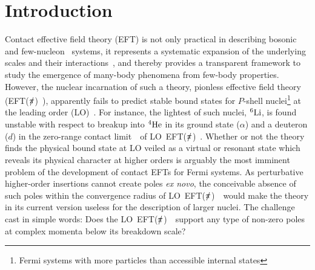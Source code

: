 \documentclass[5p,times]{elsarticle}
\newcommand{\eftnopi}{\mbox{EFT($\slashed{\pi}$) }}
\begin{document}
\maketitle

\section{Introduction}

Contact effective field theory (EFT) is not only practical in describing
bosonic~\cite{Bazak:2016wxm,Carlson:2017txq,Bazak:2018qnu,Bedaque:1998kg,Bedaque:1998km} 
and few-nucleon~\cite{Bedaque:1999ve,Barnea:2013uqa} systems, it represents a systematic
expansion of the underlying scales and their interactions~\cite{Hammer:2019poc,Barnea:2013uqa}, and
thereby provides a transparent framework to study the emergence of many-body phenomena
from few-body properties.
However, the nuclear incarnation of such a theory, pionless effective field
theory (\eftnopi), apparently fails to predict
stable bound states for $P$-shell
nuclei\footnote{Fermi systems with more particles than accessible internal states}
at the leading order (LO)~\cite{Stetcu:2006ey,Contessi:2017rww,Dawkins:2019vcr,Schafer:2020ivj}. 
%
For instance, the lightest of such nuclei, $^6 {\rm Li}$, is 
found unstable with respect to breakup into $\rm ^4He$ in its ground state ($\alpha$)
and a deuteron ($d$) in the zero-range contact limit~\cite{Schafer:2020ivj}~of LO~\eftnopi.
Whether or not the theory finds the physical bound state at LO veiled as a virtual or resonant state which
reveals its physical character at higher orders is arguably the most imminent problem of the
development of contact EFTs for Fermi systems.
As perturbative higher-order insertions cannot create poles {\it ex novo},
the conceivable absence of such poles
within the convergence radius of LO~\eftnopi~would make the theory in its current version
useless for the description of larger nuclei.
The challenge cast in simple words: 
Does the LO~\eftnopi~support any type of non-zero poles at complex momenta below its breakdown scale?
\end{document}
